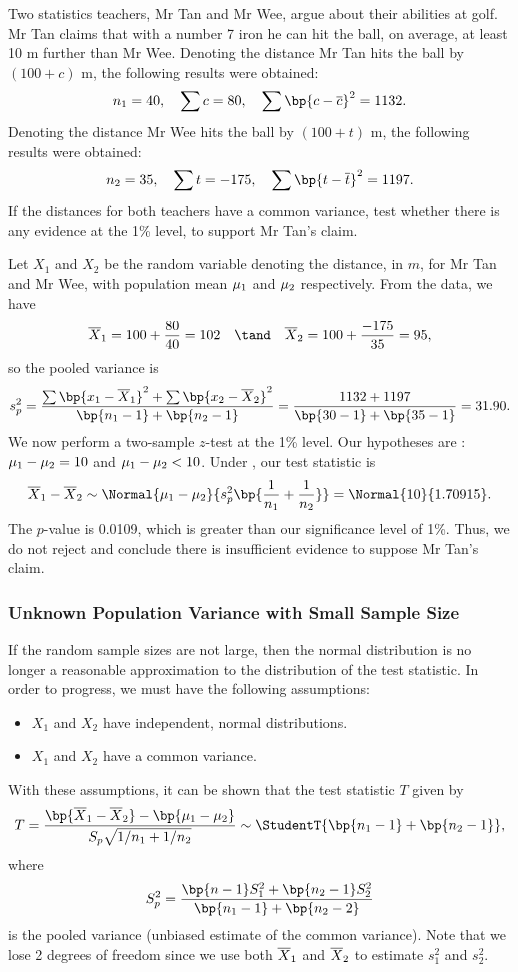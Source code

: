\begin{sample}
    Two statistics teachers, Mr Tan and Mr Wee, argue about their abilities at golf. Mr Tan claims that with a number 7 iron he can hit the ball, on average, at least 10 m further than Mr Wee. Denoting the distance Mr Tan hits the ball by $(100 + c)$ m, the following results were obtained: \[n_1 = 40, \quad \sum c = 80, \quad \sum \bp{c - \ol{c}}^2 = 1132.\] Denoting the distance Mr Wee hits the ball by $(100 + t)$ m, the following results were obtained: \[n_2 = 35, \quad \sum t = -175, \quad \sum \bp{t - \ol{t}}^2 = 1197.\] If the distances for both teachers have a common variance, test whether there is any evidence at the 1\% level, to support Mr Tan's claim.
\end{sample}
\begin{sampans}
    Let $X_1$ and $X_2$ be the random variable denoting the distance, in $m$, for Mr Tan and Mr Wee, with population mean $\mu_1$ and $\mu_2$ respectively. From the data, we have \[\ol{X}_1 = 100 + \frac{80}{40} = 102 \quad \tand \quad \ol{X}_2 = 100 + \frac{-175}{35} = 95,\] so the pooled variance is \[s_p^2 = \frac{\sum \bp{x_1 - \ol{X}_1}^2 + \sum \bp{x_2 - \ol{X}_2}^2}{\bp{n_1 - 1} + \bp{n_2 - 1}} = \frac{1132 + 1197}{\bp{30 - 1} + \bp{35 - 1}} = 31.90.\] We now perform a two-sample $z$-test at the 1\% level. Our hypotheses are \nullhyp: $\mu_1 - \mu_2 = 10$ and $\mu_1 - \mu_2 < 10$. Under \nullhyp, our test statistic is \[\ol{X}_1 - \ol{X}_2 \sim \Normal{\m_1 - \m_2}{s_p^2 \bp{\frac1{n_1} + \frac1{n_2}}} = \Normal{10}{1.70915}.\] The $p$-value is 0.0109, which is greater than our significance level of 1\%. Thus, we do not reject \nullhyp{} and conclude there is insufficient evidence to suppose Mr Tan's claim.
\end{sampans}

\subsubsection{Unknown Population Variance with Small Sample Size}

If the random sample sizes are not large, then the normal distribution is no longer a reasonable approximation to the distribution of the test statistic. In order to progress, we must have the following assumptions:
\begin{itemize}
    \item $X_1$ and $X_2$ have independent, normal distributions.
    \item $X_1$ and $X_2$ have a common variance.
\end{itemize}
With these assumptions, it can be shown that the test statistic $T$ given by \[T = \frac{\bp{\ol{X}_1 - \ol{X}_2} - \bp{\m_1 - \m_2}}{S_p \sqrt{1/n_1 + 1/n_2}} \sim \StudentT{\bp{n_1 - 1} + \bp{n_2 - 1}},\] where \[S^2_p = \frac{\bp{n-1} S_1^2 + \bp{n_2 - 1} S_2^2}{\bp{n_1 - 1} + \bp{n_2 - 2}}\] is the pooled variance (unbiased estimate of the common variance). Note that we lose 2 degrees of freedom since we use both $\overline{X}_1$ and $\overline{X}_2$ to estimate $s_1^2$ and $s_2^2$.


